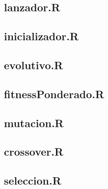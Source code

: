 \documentclass{article}
\begin{document}
\subsection{lanzador.R}

\subsection{inicializador.R}

\subsection{evolutivo.R}

\subsection{fitnessPonderado.R}

\subsection{mutacion.R}

\subsection{crossover.R}

\subsection{seleccion.R}

\end{document}
